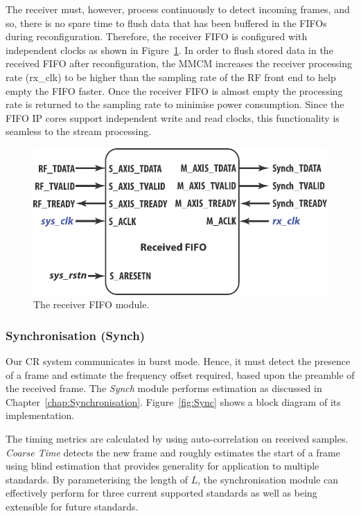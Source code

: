 The receiver must, however, process continuously to detect incoming frames, and so, there is no spare time to flush data that has been buffered in the FIFOs during reconfiguration.
Therefore, the receiver FIFO is configured with independent clocks as shown in Figure~\ref{fig:FIFO}.
In order to flush stored data in the received FIFO after reconfiguration, the MMCM increases the receiver processing rate (rx\_clk) to be higher than the sampling rate of the RF front end to help empty the FIFO faster.
Once the receiver FIFO is almost empty the processing rate is returned to the sampling rate to minimise power consumption.
Since the FIFO IP cores support independent write and read clocks, this functionality is seamless to the stream processing.
\begin{figure}
\centering
\includegraphics [width=0.5\columnwidth]{Figures/MSCR_RX_FIFO.pdf}
\caption{The receiver FIFO module.}
\label{fig:FIFO}
\end{figure}

\subsubsection{Synchronisation (Synch)}
Our CR system communicates in burst mode.
Hence, it must detect the presence of a frame and estimate the frequency offset required, based upon the preamble of the received frame.
The \emph{Synch} module performs estimation as discussed in Chapter~\ref{chap:Synchronisation}.
Figure~\ref{fig:Sync} shows a block diagram of its implementation.

The timing metrics are calculated by using auto-correlation on received samples.
\emph{Coarse Time} detects the new frame and roughly estimates the start of a frame using blind estimation that provides generality for application to multiple standards.
By parameterising the length of $L$, the synchronisation module can effectively perform for three current supported standards as well as being extensible for future standards.

